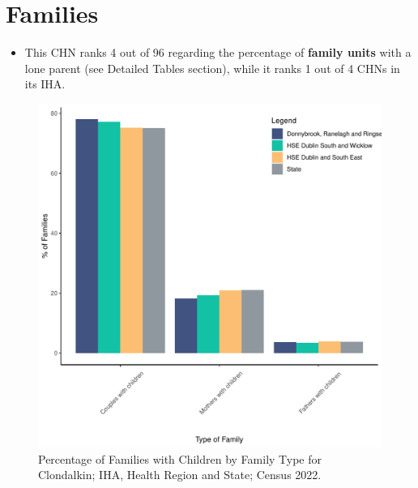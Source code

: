 \documentclass{article}
\begin{document}
\section{Families}\label{sect:Fam}
\begin{itemize}
\item This CHN ranks  4 out of 96 regarding the percentage of \textbf{family units} with a lone parent (see Detailed Tables section), while it ranks   1 out of 4 CHNs in its IHA.
\end{itemize}
\begin{figure}[H]
	\centering
	\includegraphics[width = 150mm]{../figures/FamED.pdf}
	\caption{Percentage of Families with Children by Family Type for Clondalkin; IHA, Health Region and State; Census 2022.}
	\label{fig:vbnv}
	\end{figure}
	
\end{document}
